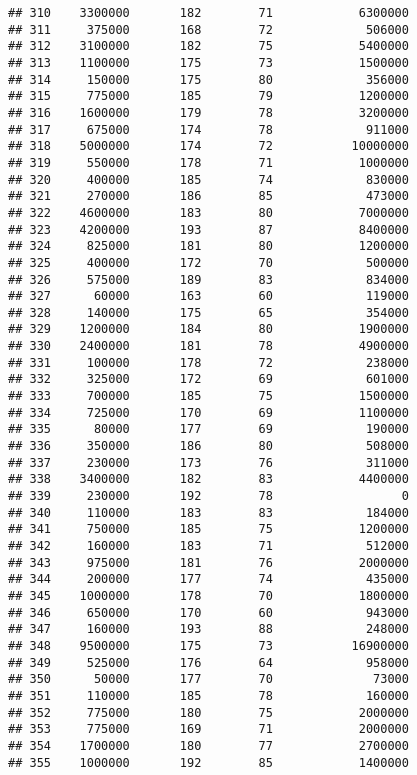 \documentclass[
]{article}
\begin{document}
\begin{verbatim}
## 310    3300000       182        71            6300000
## 311     375000       168        72             506000
## 312    3100000       182        75            5400000
## 313    1100000       175        73            1500000
## 314     150000       175        80             356000
## 315     775000       185        79            1200000
## 316    1600000       179        78            3200000
## 317     675000       174        78             911000
## 318    5000000       174        72           10000000
## 319     550000       178        71            1000000
## 320     400000       185        74             830000
## 321     270000       186        85             473000
## 322    4600000       183        80            7000000
## 323    4200000       193        87            8400000
## 324     825000       181        80            1200000
## 325     400000       172        70             500000
## 326     575000       189        83             834000
## 327      60000       163        60             119000
## 328     140000       175        65             354000
## 329    1200000       184        80            1900000
## 330    2400000       181        78            4900000
## 331     100000       178        72             238000
## 332     325000       172        69             601000
## 333     700000       185        75            1500000
## 334     725000       170        69            1100000
## 335      80000       177        69             190000
## 336     350000       186        80             508000
## 337     230000       173        76             311000
## 338    3400000       182        83            4400000
## 339     230000       192        78                  0
## 340     110000       183        83             184000
## 341     750000       185        75            1200000
## 342     160000       183        71             512000
## 343     975000       181        76            2000000
## 344     200000       177        74             435000
## 345    1000000       178        70            1800000
## 346     650000       170        60             943000
## 347     160000       193        88             248000
## 348    9500000       175        73           16900000
## 349     525000       176        64             958000
## 350      50000       177        70              73000
## 351     110000       185        78             160000
## 352     775000       180        75            2000000
## 353     775000       169        71            2000000
## 354    1700000       180        77            2700000
## 355    1000000       192        85            1400000

\end{verbatim}
\end{document}
